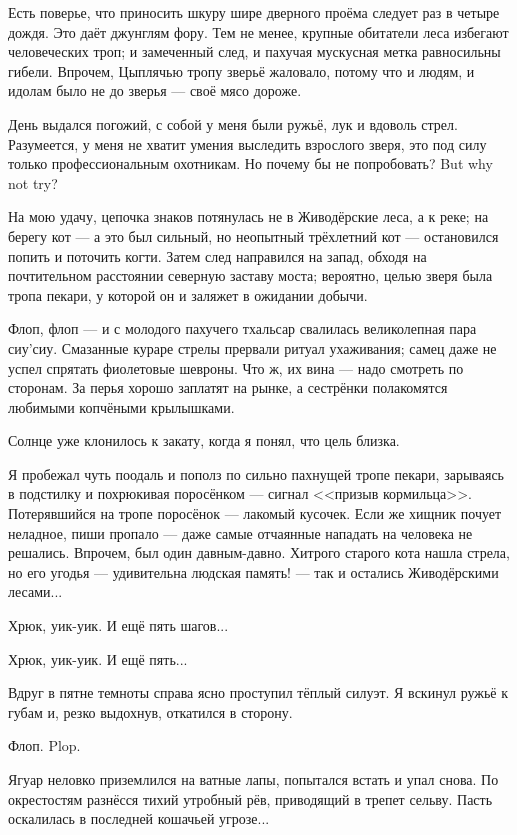 Есть поверье, что приносить шкуру шире дверного проёма следует раз в четыре дождя.
Это даёт джунглям фору.
Тем не менее, крупные обитатели леса избегают человеческих троп;
и замеченный след, и пахучая мускусная метка равносильны гибели.
Впрочем, Цыплячью тропу зверьё жаловало, потому что и людям, и идолам было не до зверья --- своё мясо дороже.

День выдался погожий, с собой у меня были ружьё, лук и вдоволь стрел.
Разумеется, у меня не хватит умения выследить взрослого зверя, это под силу только профессиональным охотникам.
{Но почему бы не попробовать?}
{But why not try?}

На мою удачу, цепочка знаков потянулась не в Живодёрские леса, а к реке;
на берегу кот --- а это был сильный, но неопытный трёхлетний кот --- остановился попить и поточить когти.
Затем след направился на запад, обходя на почтительном расстоянии северную заставу моста;
вероятно, целью зверя была тропа пекари, у которой он и заляжет в ожидании добычи.

Флоп, флоп --- и с молодого пахучего тхальсар свалилась великолепная пара сиу'сиу.
Смазанные кураре стрелы прервали ритуал ухаживания;
самец даже не успел спрятать фиолетовые шевроны.
Что ж, их вина --- надо смотреть по сторонам.
За перья хорошо заплатят на рынке, а сестрёнки полакомятся любимыми копчёными крылышками.

Солнце уже клонилось к закату, когда я понял, что цель близка.

Я пробежал чуть поодаль и пополз по сильно пахнущей тропе пекари, зарываясь в подстилку и похрюкивая поросёнком --- сигнал <<призыв кормильца>>.
Потерявшийся на тропе поросёнок --- лакомый кусочек.
Если же хищник почует неладное, пиши пропало --- даже самые отчаянные нападать на человека не решались.
Впрочем, был один давным-давно.
Хитрого старого кота нашла стрела, но его угодья --- удивительна людская память! --- так и остались Живодёрскими лесами...

Хрюк, уик-уик.
И ещё пять шагов...

Хрюк, уик-уик.
И ещё пять...

Вдруг в пятне темноты справа ясно проступил тёплый силуэт.
Я вскинул ружьё к губам и, резко выдохнув, откатился в сторону.

{Флоп.}
{Plop.}

Ягуар неловко приземлился на ватные лапы, попытался встать и упал снова.
По окрестостям разнёсся тихий утробный рёв, приводящий в трепет сельву.
Пасть оскалилась в последней кошачьей угрозе...

